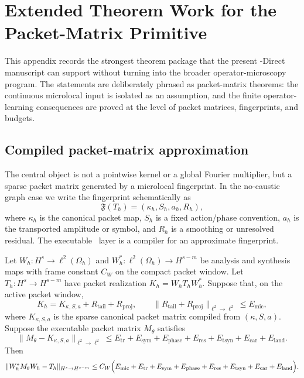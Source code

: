 \section{Extended Theorem Work for the Packet-Matrix Primitive}
\label{app:flagship-theorems}

This appendix records the strongest theorem package that the present \MiNO-Direct
manuscript can support without turning into the broader operator-microscopy
program.  The statements are deliberately phrased as packet-matrix theorems:
the continuous microlocal input is isolated as an assumption, and the finite
operator-learning consequences are proved at the level of packet matrices,
fingerprints, and budgets.

\subsection{Compiled packet-matrix approximation}

The central object is not a pointwise kernel or a global Fourier multiplier,
but a sparse packet matrix generated by a microlocal fingerprint.  In the
no-caustic graph case we write the fingerprint schematically as
\[
  \mathfrak F(T_h)=(\kappa_h,S_h,a_h,R_h),
\]
where $\kappa_h$ is the canonical packet map, $S_h$ is a fixed action/phase
convention, $a_h$ is the transported amplitude or symbol, and $R_h$ is a
smoothing or unresolved residual.  The executable \MiNO\ layer is a compiler
for an approximate fingerprint.

\begin{theorem}
\label{thm:fingerprint-compiler-stability}
Let $W_h:H^s\to \ell^2(\Omega_h)$ and $W_h^\ast:\ell^2(\Omega_h)\to H^{s-m}$
be analysis and synthesis maps with frame constant $C_W$ on the compact packet
window.  Let $T_h:H^s\to H^{s-m}$ have packet realization
$K_h=W_hT_hW_h^\ast$.  Suppose that, on the active packet window,
\[
  K_h = K_{\kappa,S,a}+R_{\mathrm{tail}}+R_{\mathrm{proj}},
  \qquad
  \|R_{\mathrm{tail}}+R_{\mathrm{proj}}\|_{\ell^2\to\ell^2}\le E_{\mathrm{mic}},
\]
where $K_{\kappa,S,a}$ is the sparse canonical packet matrix compiled from
$(\kappa,S,a)$.  Suppose the executable packet matrix $M_\theta$ satisfies
\[
 \|M_\theta-K_{\kappa,S,a}\|_{\ell^2\to\ell^2}
 \le
 E_{\mathrm{tr}}+E_{\mathrm{sym}}+E_{\mathrm{phase}}
 +E_{\mathrm{res}}+E_{\mathrm{tsyn}}+E_{\mathrm{car}}+E_{\mathrm{land}} .
\]
Then
\[
\|W_h^\ast M_\theta W_h-T_h\|_{H^s\to H^{s-m}}
\le
C_W\Bigl(
E_{\mathrm{mic}}+E_{\mathrm{tr}}+E_{\mathrm{sym}}+E_{\mathrm{phase}}
+E_{\mathrm{res}}+E_{\mathrm{tsyn}}+E_{\mathrm{car}}+E_{\mathrm{land}}
\Bigr).
\]
\end{theorem}

